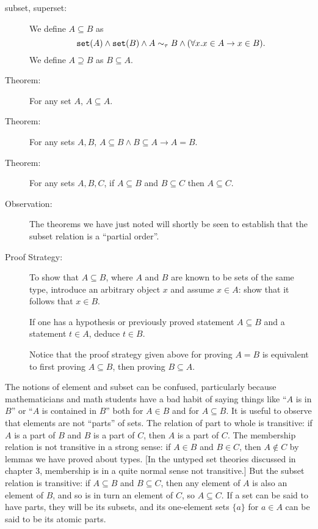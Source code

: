 \documentclass[12pt]{book}
\begin{document}
\begin{description}

\item[subset, superset:] We define $A \subseteq B$ as $${\tt
set}(A)\wedge{\tt set}(B) \wedge A \sim_{\tau} B \wedge (\forall x.x \in A \rightarrow x \in
B).$$  We define $A \supseteq B$ as $B \subseteq A$.

\item[Theorem:] For any set $A$, $A \subseteq A$.

\item[Theorem:]  For any sets $A,B$, $A \subseteq B \wedge B \subseteq A \rightarrow A=B$.

\item[Theorem:] For any sets $A,B,C$, if $A \subseteq B$ and $B
\subseteq C$ then $A \subseteq C$.

\item[Observation:] The theorems we have just noted will shortly be
seen to establish that the subset relation is a ``partial order''.

\item[Proof Strategy:] To show that $A \subseteq B$, where $A$ and $B$
are known to be sets of the same type, introduce an arbitrary object $x$ and assume
$x\in A$: show that it follows that $x\in B$.

If one has a hypothesis or previously proved statement $A \subseteq B$ and a statement $t \in A$, deduce $t \in B$.

Notice that the proof strategy given above for
proving $A = B$ is equivalent to first proving $A \subseteq B$, then
proving $B \subseteq A$.

\end{description}

The notions of element and subset can be confused, particularly
because mathematicians and math students have a bad habit of saying things like ``$A$ is in $B$'' or
``$A$ is contained in $B$'' both  for $A \in B$ and for $A \subseteq B$.  It
is useful to observe that elements are not ``parts'' of sets.  The
relation of part to whole is transitive: if $A$ is a part of $B$ and
$B$ is a part of $C$, then $A$ is a part of $C$.  The membership
relation is not transitive in a strong sense:  if $A \in B$
and $B \in C$, then $A \not\in C$ by lemmas we have proved about types.  [In the untyped set theories discussed in chapter 3,
membership is in a quite normal sense not transitive.]  But the subset
relation is transitive: if $A \subseteq B$ and $B \subseteq C$, then
any element of $A$ is also an element of $B$, and so is in turn an
element of $C$, so $A \subseteq C$.  If a set can be said to have
parts, they will be its subsets, and its one-element sets $\{a\}$ for
$a \in A$ can be said to be its atomic parts.
\end{document}

